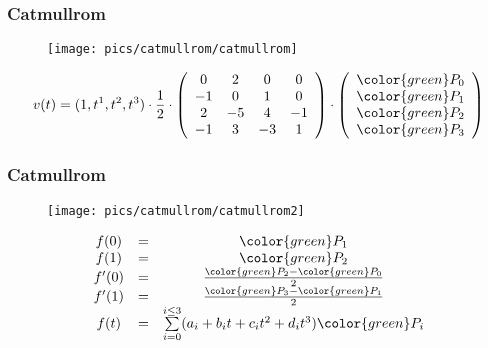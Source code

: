 \begin{frame}
\frametitle{Catmullrom}
  \begin{figure}[h]
  \texttt{[image: pics/catmullrom/catmullrom]}
  \end{figure}
  {\scriptsize
    $$
v(t)=(1,t^1,t^2,t^3)\cdot
\frac{1}{2}\cdot
\left(
\begin{array}{cccc}
 0 &  2 &  0 &  0 \\
-1 &  0 &  1 &  0 \\
 2 & -5 &  4 & -1 \\
-1 &  3 & -3 &  1
\end{array}
\right)
\cdot
\left(
\begin{array}{c}
  {\color{green}P_{0}} \\
  {\color{green}P_{1}} \\
  {\color{green}P_{2}} \\
  {\color{green}P_{3}} 
\end{array}
\right)
$$
  }
\end{frame}

\begin{frame}
\frametitle{Catmullrom}
  \begin{figure}[h]
  \texttt{[image: pics/catmullrom/catmullrom2]}
  \end{figure}
  {\scriptsize
    \[
    \begin{array}{ccc}
      f(0) &=& {\color{green}P_1} \\
      f(1) &=& {\color{green}P_2} \\
     f'(0) &=& \frac{{\color{green}P_2}-{\color{green}P_0}}{2} \\
     f'(1) &=& \frac{{\color{green}P_3}-{\color{green}P_1}}{2} \\
      f(t) &=& \sum\limits_{i=0}^{i \leq 3}(a_i+b_it+c_it^2+d_it^3){\color{green}P_i}
    \end{array}
    \]
  }
\end{frame}

